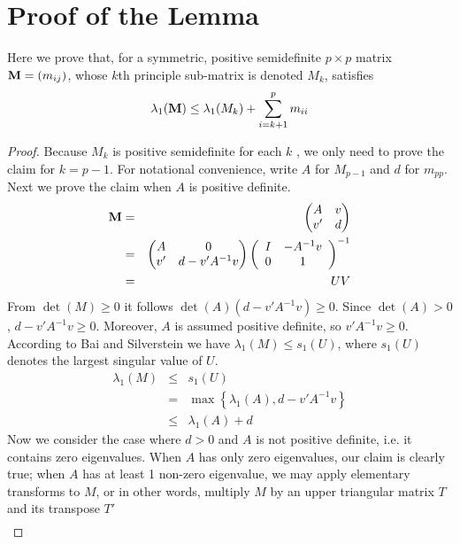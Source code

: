 \documentclass{article}
\begin{document}
\section{Proof of the Lemma}
Here we prove that, for a symmetric, positive semidefinite $p \times
p$ matrix $\mathbf{M} = (m_{ij})$, whose $k$th principle sub-matrix is denoted
$M_k$, satisfies
\[
\lambda_1(\mathbf{M}) \leq \lambda_1(M_{k}) + \sum_{i=k+1}^p m_{ii}
\]
\begin{proof}
  Because $M_k$ is positive semidefinite for each $k$ , we only need
  to prove the claim for $k=p-1$. For notational convenience, write
  $A$ for $M_{p-1}$ and $d$ for $m_{pp}$. Next we prove the claim when
  $A$ is positive definite.
  \begin{eqnarray*}
    \mathbf{M} &=&
    \begin{pmatrix}
      A & v \\
      v' & d
    \end{pmatrix} \\
    &=&
    \begin{pmatrix}
      A & 0 \\
      v' & d - v' A^{-1} v
    \end{pmatrix}\left(
      \begin{array}{cc}
        I & -A^{-1} v \\
        0 & 1
      \end{array}\right)^{-1} \\
    &=& U V
  \end{eqnarray*}
  From $\det(M) \geq 0$ it follows $\det(A) (d - v' A^{-1} v) \geq
  0$. Since $\det(A) > 0$, $d - v' A^{-1} v \geq 0$. Moreover, $A$ is
  assumed positive definite, so $v' A^{-1} v \geq 0$. According
  to Bai and Silverstein\cite{BaiSilverstein2010} we have
  $\lambda_1(M) \leq s_1(U)$, where $s_1(U)$ denotes the largest
  singular value of $U$.
  \begin{eqnarray*}
    \lambda_1(M) &\leq& s_1(U) \\
    &=& \max\left\{\lambda_1(A), d - v' A^{-1} v \right\} \\
    &\leq& \lambda_1(A) + d
  \end{eqnarray*}
  Now we consider the case where $ d > 0$ and $A$ is not positive
  definite, i.e. it contains zero eigenvalues. When $A$ has only zero
  eigenvalues, our claim is clearly true; when $A$ has at least 1
  non-zero eigenvalue, we may apply elementary transforms to $M$,
  or in other words, multiply $M$ by an upper triangular matrix $T$
  and its transpose $T'$
  \begin{eqnarray*}

\end{eqnarray*}
\end{proof}
\end{document}
